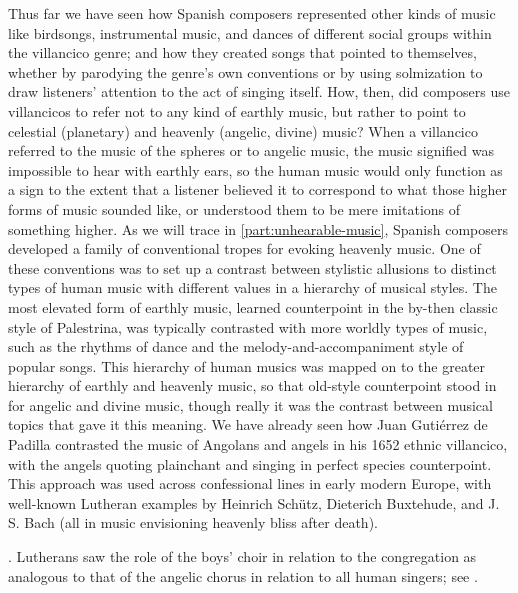 Thus far we have seen how Spanish composers represented other kinds of music
like birdsongs, instrumental music, and dances of different social groups
within the villancico genre; and how they created songs that pointed to
themselves, whether by parodying the genre's own conventions or by using
solmization to draw listeners' attention to the act of singing itself.
How, then, did composers use villancicos to refer not to any kind of earthly
music, but rather to point to celestial (planetary) and heavenly (angelic,
divine) music?
When a villancico referred to the music of the spheres or to angelic music, the
music signified was impossible to hear with earthly ears, so the human music
would only function as a sign to the extent that a listener believed it to
correspond to what those higher forms of music sounded like, or understood them
to be mere imitations of something higher.
As we will trace in \cref{part:unhearable-music}, Spanish composers developed a
family of conventional tropes for evoking heavenly music.
One of these conventions was to set up a contrast between stylistic allusions
to distinct types of human music with different values in a hierarchy of
musical styles.
The most elevated form of earthly music, learned counterpoint in the by-then
classic style of Palestrina, was typically contrasted with more worldly types
of music, such as the rhythms of dance and the melody-and-accompaniment style
of popular songs.
This hierarchy of human musics was mapped on to the greater hierarchy of
earthly and heavenly music, so that old-style counterpoint stood in for
angelic and divine music, though really it was the contrast between musical
topics that gave it this meaning.
We have already seen how Juan Gutiérrez de Padilla contrasted the music of
Angolans and angels in his 1652 ethnic villancico, with the angels quoting
plainchant and singing in perfect species counterpoint.
This approach was used across confessional lines in early modern Europe,
with well-known Lutheran examples by Heinrich Schütz, Dieterich Buxtehude, and
J. S. Bach (all in music envisioning heavenly bliss after death).%
\begin{Footnote}
    \Autocites{Johnston:RhetoricalPersonification}
    {Yearsley:Buxtehude}{Yearsley:BachThron}.
    Lutherans saw the role of the boys' choir in relation to the congregation
    as analogous to that of the angelic chorus in relation to all human
    singers; see \autocite[\XXX]{Cashner:Gerhardt}.
\end{Footnote}

